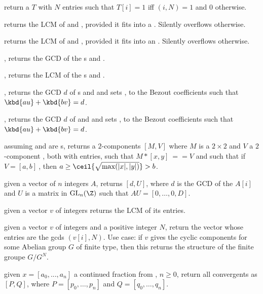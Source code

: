  return a  $T$ with $N$ entries
such that $T[i] = 1$ iff $(i,N) = 1$ and $0$ otherwise.

 returns the LCM of  and ,
provided it fits into a . Silently overflows otherwise.

 returns the LCM of  and ,
provided it fits into an . Silently overflows otherwise.

, returns the GCD of the s  and
.

, returns the LCM of the s  and
.

, returns the GCD $d$ of
s  and  and sets ,  to the Bezout
coefficients such that $\kbd{au} + \kbd{bv} = d$.

, returns the GCD
$d$ of  and  and sets ,  to the Bezout coefficients
such that $\kbd{au} + \kbd{bv} = d$.

assuming  and  are s,
returns a $2$-components  $[M,V]$ where $M$ is a $2\times 2$
 and $V$ a $2$-component , both with  entries,
such that $M*[x,y]~==V$ and such that  if $V=[a,b]~$, then
$a \geq \ceil{\sqrt{\max(|x|,|y|)}} > b$.

 given a vector of $n$ integers $A$, returns $[d,
U]$, where $d$ is the GCD of the $A[i]$ and $U$ is a matrix
in $\text{GL}_n(\Z)$ such that $AU = [0,\dots,0,D]$.

 given a vector $v$ of integers
returns the LCM of its entries.

 given a vector $v$ of integers and a
positive integer $N$, return the vector whose entries are the gcds
$(v[i],N)$. Use case: if $v$ gives the cyclic components for some Abelian
group $G$ of finite type, then this returns the structure of the finite
groupe $G/G^N$.


 given $x = [a_0, ..., a_n]$ a
continued fraction from , $n\geq0$, return all
convergents as $[P,Q]$, where $P = [p_0,\dots,p_n]$ and $Q =
[q_0,\dots,q_n]$.

